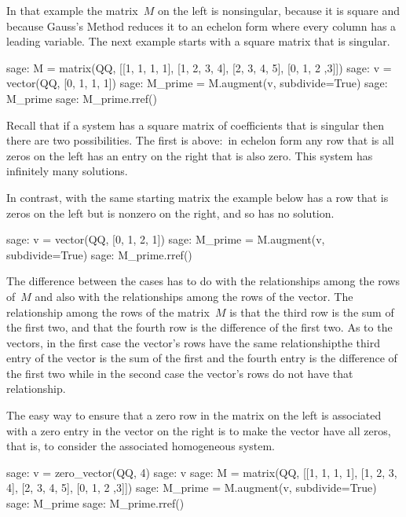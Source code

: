 In that example the matrix~$M$ on the left is nonsingular, because it is 
square and because Gauss's Method reduces it to an 
echelon form where every
column has a leading variable.
The next example starts with a
square matrix that is singular. 
\begin{sagecommandline}
sage: M = matrix(QQ, [[1, 1, 1, 1], [1, 2, 3, 4], [2, 3, 4, 5], [0, 1, 2 ,3]]) 
sage: v = vector(QQ, [0, 1, 1, 1]) 
sage: M_prime = M.augment(v, subdivide=True)
sage: M_prime
sage: M_prime.rref()
\end{sagecommandline}
Recall that if a system has a square matrix of coefficients 
that is singular then there are two possibilities.
The first is above:~in echelon form
any row that is all zeros on the
left has an entry on the right that is also zero.
This system has infinitely many solutions.

In contrast, with the same starting matrix
the example below has a row that is zeros on the left but is nonzero
on the right, and so has no solution.
\begin{sagecommandline} 
sage: v = vector(QQ, [0, 1, 2, 1])             
sage: M_prime = M.augment(v, subdivide=True)
sage: M_prime.rref()                        
\end{sagecommandline}

The difference between the cases
has to do with the relationships among  
the rows of~$M$ and also with the relationships among the rows of the vector.
The relationship among the rows of the matrix~$M$
is that the third row is the sum of the first two, and that the fourth
row is the difference of the first two.
As to the vectors, in the first case the vector's rows have the same 
relationship\Dash the third entry of the vector is the sum of the first 
and the fourth entry is the difference of the first two\Dash  
while in the second case the vector's rows do not have that relationship.

The easy way to ensure that a zero row in the matrix 
on the left is associated with a zero
entry in the vector on the right is to make the vector have all zeros, that is,
to consider the associated homogeneous system.
\begin{sagecommandline}
sage: v = zero_vector(QQ, 4)
sage: v
sage: M = matrix(QQ, [[1, 1, 1, 1], [1, 2, 3, 4], [2, 3, 4, 5], [0, 1, 2 ,3]]) 
sage: M_prime = M.augment(v, subdivide=True)
sage: M_prime
sage: M_prime.rref()
\end{sagecommandline}

